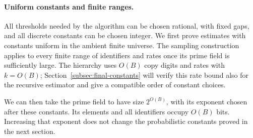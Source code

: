 \paragraph{Uniform constants and finite ranges.}
All thresholds needed by the algorithm can be chosen rational, with
fixed gaps, and all discrete constants can be chosen integer. We
first prove estimates with constants uniform in the ambient finite
universe. The sampling construction applies to every finite range of
identifiers and rates once its prime field is sufficiently large.
The hierarchy uses $O(B)$ copy digits and rates with $k=O(B)$;
Section~\ref{subsec:final-constants} will verify this rate bound also
for the recursive estimator and give a compatible order of constant
choices.

We can then take the prime field to have size $2^{O(B)}$, with its
exponent chosen after these constants. Its elements and all identifiers
occupy $O(B)$ bits. Increasing that exponent does not change the
probabilistic constants proved in the next section.
